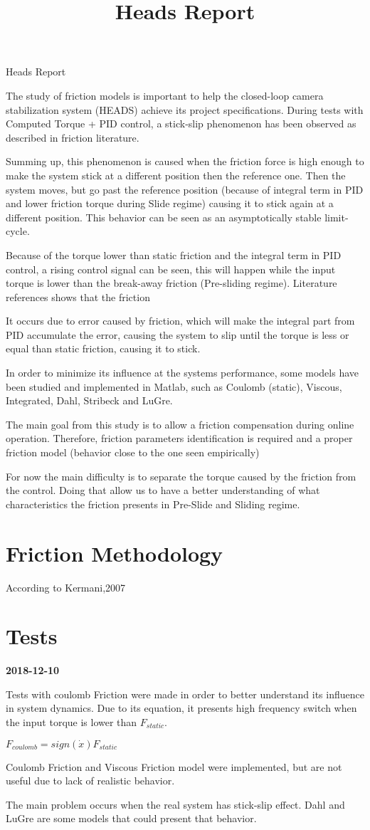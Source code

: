 \documentclass{paper}
\begin{document}
 \title{Heads Report}
Heads Report

The study of friction models is important to help the closed-loop camera stabilization system (HEADS) achieve its project specifications. During tests with Computed Torque + PID control, a stick-slip phenomenon has been observed as described in friction literature.

Summing up, this phenomenon is caused when the friction force is high enough to make the system stick at a different position then the reference one. Then the system moves, but go past the reference position (because of integral term in PID and lower friction torque during Slide regime) causing it to stick again at a different position. This behavior can be seen as an asymptotically stable limit-cycle.

Because of the torque lower than static friction and the integral term in PID control, a rising control signal can be seen, this will happen while the input torque is lower than the break-away friction (Pre-sliding regime). Literature references shows that the friction   

It occurs due to error caused by friction, which will make the integral part from PID accumulate the error, causing the system to slip until the torque is less or equal than static friction, causing it to stick.
    
In order to minimize its influence at the systems performance, some models have been studied and implemented in Matlab, such as Coulomb (static), Viscous, Integrated, Dahl, Stribeck and LuGre.

The main goal from this study is to allow a friction compensation during online operation. Therefore, friction parameters identification is required and a proper friction model (behavior close to the one seen empirically)

For now the main difficulty is to separate the torque caused by the friction from the control. Doing that allow us to have a better understanding of what characteristics the friction presents in Pre-Slide and Sliding regime.

\section{Friction Methodology}
According to Kermani,2007 

\section{Tests}

\textbf{2018-12-10}

Tests with coulomb Friction were made in order to better understand its influence in system dynamics. Due to its equation, it presents high frequency switch when the input torque is lower than $F_{static}$.

$ F_{coulomb} = sign(\dot{x})F_{static}$

Coulomb Friction and Viscous Friction model were implemented, but are not useful due to lack of realistic behavior.

The main problem occurs when the real system has stick-slip effect. Dahl and LuGre are some models that could present that behavior.
\end{document}
